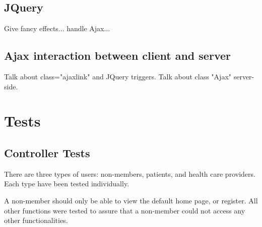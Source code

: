 \documentclass[12pt]{report}
\begin{document}
\subsection{JQuery}
Give fancy effects... handle Ajax... 
\subsection{Ajax interaction between client and server}
Talk about class="ajaxlink" and JQuery triggers. Talk about class "Ajax" server-side.

\section{Tests}

\subsection{Controller Tests}

There are three types of users: non-members, patients, and health care providers. Each type have been tested individually.

A non-member should only be able to view the default home page, or register. All other functions were tested to assure that a non-member could not access any other functionalities. 
\end{document}

